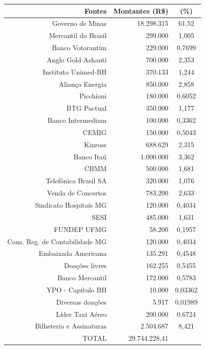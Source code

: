 \documentclass[a4paper, 12pt, openright, oneside, german, french, english, brazil]{abntex2}
\begin{document}
	
	
	\begin{table}[!h]
		{\begin{tabular}{rrc}
				\hline
				Fontes & Montantes (R\$) & (\%)  \\
				\hline
				Governo de Minas & 18.298.315 & 61,52 \\ 
				Mercantil do Brasil & 299.000 & 1,005 \\ 
				Banco Votorantim & 229.000 & 0,7699 \\ 
				Anglo Gold Ashanti & 700.000 & 2,353 \\ 
				Instituto Unimed-BH & 370.133 & 1,244 \\ 
				Aliança Energia & 850.000 & 2,858 \\ 
				Picchioni & 180.000 & 0,6052 \\ 
				BTG Pactual & 350.000 & 1,177 \\ 
				Banco Intermedium & 100.000 & 0,3362 \\ 
				CEMIG & 150.000 & 0,5043 \\ 
				Kinross & 688.629 & 2,315 \\ 
				Banco Itaú & 1.000.000 & 3,362 \\ 
				CBMM & 500.000 & 1,681 \\ 
				Telefônica Brasil SA & 320.000 & 1,076 \\ 
				Venda de Concertos & 783.200 & 2,633 \\ 
				Sindicato Hospitais MG & 120.000 & 0,4034 \\ 
				SESI & 485.000 & 1,631 \\ 
				FUNDEP UFMG & 58.200 & 0,1957 \\ 
				Cons. Reg. de Contabilidade MG & 120.000 & 0,4034 \\ 
				Embaixada Americana & 135.291 & 0,4548 \\ 
				Doações livres & 162.255 & 0,5455 \\ 
				Banco Mercantil & 172.000 & 0,5783 \\ 
				YPO - Capítulo BH & 10.000 & 0,03362 \\ 
				Diversas doações & 5.917 & 0,01989 \\ 
				Líder Taxi Aéreo & 200.000 & 0,6724 \\ 
				Bilheteria e Assinaturas & 2.504.687 & 8,421 \\ 
				\hline
				TOTAL & 29.744.228,41 &  \\
				\hline
			\end{tabular}
		}
		{
		}
	\end{table}
	
\end{document}
